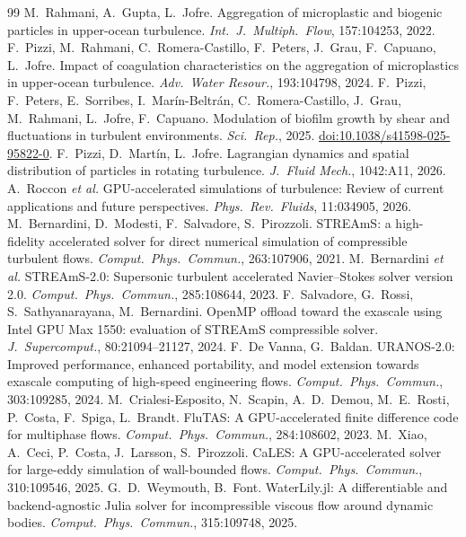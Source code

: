 \documentclass[11pt]{article}
\begin{document}
\begin{thebibliography}{99}
 M.\ Rahmani, A.\ Gupta, L.\ Jofre. Aggregation of microplastic and biogenic particles in upper-ocean turbulence. \emph{Int.\ J.\ Multiph.\ Flow}, 157:104253, 2022.
 F.\ Pizzi, M.\ Rahmani, C.\ Romera-Castillo, F.\ Peters, J.\ Grau, F.\ Capuano, L.\ Jofre. Impact of coagulation characteristics on the aggregation of microplastics in upper-ocean turbulence. \emph{Adv.\ Water Resour.}, 193:104798, 2024.
 F.\ Pizzi, F.\ Peters, E.\ Sorribes, I.\ Mar\'in-Beltr\'an, C.\ Romera-Castillo, J.\ Grau, M.\ Rahmani, L.\ Jofre, F.\ Capuano. Modulation of biofilm growth by shear and fluctuations in turbulent environments. \emph{Sci.\ Rep.}, 2025. \href{https://doi.org/10.1038/s41598-025-95822-0}{doi:10.1038/s41598-025-95822-0}.
 F.\ Pizzi, D.\ Mart\'in, L.\ Jofre. Lagrangian dynamics and spatial distribution of particles in rotating turbulence. \emph{J.\ Fluid Mech.}, 1042:A11, 2026.
 A.\ Roccon \emph{et al.} GPU-accelerated simulations of turbulence: Review of current applications and future perspectives. \emph{Phys.\ Rev.\ Fluids}, 11:034905, 2026.
 M.\ Bernardini, D.\ Modesti, F.\ Salvadore, S.\ Pirozzoli. STREAmS: a high-fidelity accelerated solver for direct numerical simulation of compressible turbulent flows. \emph{Comput.\ Phys.\ Commun.}, 263:107906, 2021.
 M.\ Bernardini \emph{et al.} STREAmS-2.0: Supersonic turbulent accelerated Navier--Stokes solver version 2.0. \emph{Comput.\ Phys.\ Commun.}, 285:108644, 2023.
 F.\ Salvadore, G.\ Rossi, S.\ Sathyanarayana, M.\ Bernardini. OpenMP offload toward the exascale using Intel GPU Max 1550: evaluation of STREAmS compressible solver. \emph{J.\ Supercomput.}, 80:21094--21127, 2024.
 F.\ De Vanna, G.\ Baldan. URANOS-2.0: Improved performance, enhanced portability, and model extension towards exascale computing of high-speed engineering flows. \emph{Comput.\ Phys.\ Commun.}, 303:109285, 2024.
 M.\ Crialesi-Esposito, N.\ Scapin, A.\ D.\ Demou, M.\ E.\ Rosti, P.\ Costa, F.\ Spiga, L.\ Brandt. FluTAS: A GPU-accelerated finite difference code for multiphase flows. \emph{Comput.\ Phys.\ Commun.}, 284:108602, 2023.
 M.\ Xiao, A.\ Ceci, P.\ Costa, J.\ Larsson, S.\ Pirozzoli. CaLES: A GPU-accelerated solver for large-eddy simulation of wall-bounded flows. \emph{Comput.\ Phys.\ Commun.}, 310:109546, 2025.
 G.\ D.\ Weymouth, B.\ Font. WaterLily.jl: A differentiable and backend-agnostic Julia solver for incompressible viscous flow around dynamic bodies. \emph{Comput.\ Phys.\ Commun.}, 315:109748, 2025.

\end{thebibliography}
\end{document}
